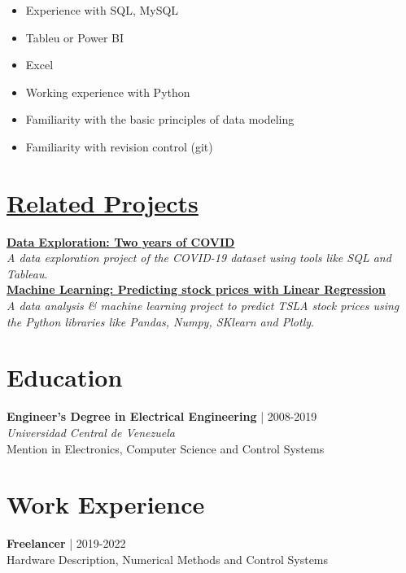 \documentclass[11pt]{article} %
\def\ucv{Universidad Central de Venezuela}
\begin{document}
\begin{itemize}
\itemsep0em
\item Experience with SQL, MySQL
\item Tableu or Power BI
\item Excel
\item Working experience with Python
\item Familiarity with the basic principles of data modeling
\item Familiarity with revision control (git)
\end{itemize}

\section*{\href{https://github.com/dquerales/DataScience}{Related Projects}}

\textbf{\href{https://dquerales.github.io/DanielPortfolio/two_years_of_covid.html}{Data Exploration: Two years of COVID}}\\ 
\emph{A data exploration project of the COVID-19 dataset using tools like SQL and Tableau}.\\

\textbf{\href{https://dquerales.github.io/DanielPortfolio/linear_regression.html}{Machine Learning: Predicting stock prices with Linear Regression}}\\ 
\emph{A data analysis \& machine learning project to predict TSLA stock prices using the Python libraries like Pandas, Numpy, SKlearn and Plotly}.


\section*{Education}

\textbf{Engineer's Degree in Electrical Engineering} | 2008-2019 \\ 
\emph{\ucv}\\
Mention in Electronics, Computer Science and Control Systems

\section*{Work Experience}

\textbf{Freelancer} | 2019-2022 \\ 
Hardware Description, Numerical Methods and Control Systems 

%
%
\end{document}
